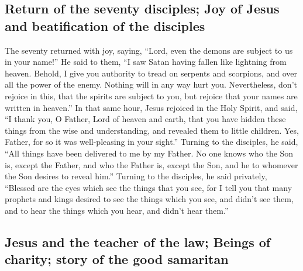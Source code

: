 \begin{paracol}{2}
\begin{otherlanguage}{english}
\hypertarget{return-of-the-seventy-disciples-joy-of-jesus-and-beatification-of-the-disciples}{%
\subsection{Return of the seventy disciples; Joy of Jesus and
beatification of the
disciples}\label{return-of-the-seventy-disciples-joy-of-jesus-and-beatification-of-the-disciples}}

 The seventy returned with joy, saying, ``Lord, even the
demons are subject to us in your name!''  He said to
them, ``I saw Satan having fallen like lightning from heaven.
 Behold, I give you authority to tread on serpents and
scorpions, and over all the power of the enemy. Nothing will in any way
hurt you.  Nevertheless, don't rejoice in this, that the
spirits are subject to you, but rejoice that your names are written in
heaven.''  In that same hour, Jesus rejoiced in the Holy
Spirit, and said, ``I thank you, O Father, Lord of heaven and earth,
that you have hidden these things from the wise and understanding, and
revealed them to little children. Yes, Father, for so it was
well-pleasing in your sight.''  Turning to the disciples,
he said, ``All things have been delivered to me by my Father. No one
knows who the Son is, except the Father, and who the Father is, except
the Son, and he to whomever the Son desires to reveal him.''
 Turning to the disciples, he said privately, ``Blessed
are the eyes which see the things that you see,  for I
tell you that many prophets and kings desired to see the things which
you see, and didn't see them, and to hear the things which you hear, and
didn't hear them.''

\hypertarget{jesus-and-the-teacher-of-the-law-beings-of-charity-story-of-the-good-samaritan}{%
\subsection{Jesus and the teacher of the law; Beings of charity; story
of the good
samaritan}\label{jesus-and-the-teacher-of-the-law-beings-of-charity-story-of-the-good-samaritan}}


\end{otherlanguage}
\end{paracol}
